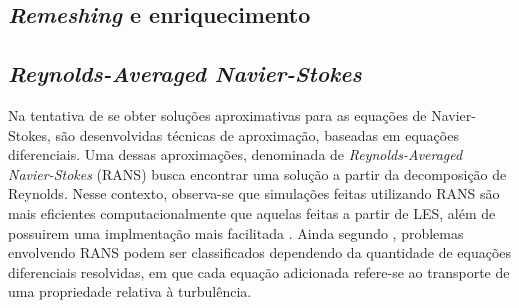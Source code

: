 \documentclass[_ArquivoPrincipal.tex]{subfiles}
\begin{document}
\subsection{\textit{Remeshing} e enriquecimento} \label{ReE}

\subsection{\textit{Reynolds-Averaged Navier-Stokes}} \label{RANS}

Na tentativa de se obter soluções aproximativas para as equações de Navier-Stokes, são desenvolvidas técnicas de aproximação, baseadas em equações diferenciais. Uma dessas aproximações, denominada de \textit{Reynolds-Averaged Navier-Stokes} (RANS) busca encontrar uma solução a partir da decomposição de Reynolds. Nesse contexto, observa-se que simulações feitas utilizando RANS são mais eficientes computacionalmente que aquelas feitas a partir de LES, além de possuirem uma implmentação mais facilitada \cite{alfonsi2009reynolds, ling2015evaluation}. Ainda segundo , problemas envolvendo RANS podem ser classificados dependendo da quantidade de equações diferenciais resolvidas, em que cada equação adicionada refere-se ao transporte de uma propriedade relativa à turbulência.
\end{document}
